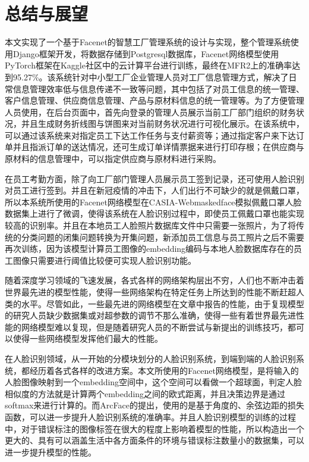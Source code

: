 \section{总结与展望}

本文实现了一个基于Facenet的智慧工厂管理系统的设计与实现，整个管理系统使用Django框架开发，将数据存储到Postgresql数据库，Facenet网络模型使用PyTorch框架在Kaggle社区中的云计算平台进行训练，最终在MFR2上的准确率达到95.27\%。该系统针对中小型工厂企业管理人员对工厂信息管理方式，解决了日常信息管理效率低与信息传递不一致等问题，其中包括了对员工信息的统一管理、客户信息管理、供应商信息管理、产品与原材料信息的统一管理等。为了方便管理人员使用，在后台页面中，首先向登录的管理人员展示当前工厂部门组织的财务状况，并且生成财务折线图与饼图来对当前财务状况进行可视化展示。在该系统中，可以通过该系统来对指定员工下达工作任务与支付薪资等；通过指定客户来下达订单并且指派订单的送达情况，还可生成订单详情票据来进行打印存根；在供应商与原材料的信息管理中，可以指定供应商与原材料进行采购。

在员工考勤方面，除了向工厂部门管理人员展示员工签到记录，还可使用人脸识别对员工进行签到。并且在新冠疫情的冲击下，人们出行不可缺少的就是佩戴口罩，所以本系统所使用的Facenet网络模型在CASIA-Webmaskedface模拟佩戴口罩人脸数据集上进行了微调，使得该系统在人脸识别过程中，即使员工佩戴口罩也能实现较高的识别率。并且在本地员工人脸照片数据库文件中只需要一张照片，为了将传统的分类问题的闭集问题转换为开集问题，新添加员工信息与员工照片之后不需要再次训练，因为该模型计算员工图像的embedding编码与本地人脸数据库存在的员工图像只需要进行阈值比较便可实现人脸识别功能。

随着深度学习领域的飞速发展，各式各样的网络架构层出不穷，人们也不断冲击着世界最先进的模型性能，使得一些网络架构在特定任务上所达到的性能不断赶超人类的水平。尽管如此，一些最先进的网络模型在文章中报告的性能，由于复现模型的研究人员缺少数据集或对超参数的调节不那么准确，使得一些有着世界最先进性能的网络模型难以复现，但是随着研究人员的不断尝试与新提出的训练技巧，都可以使得一些网络模型发挥他们最大的性能。

在人脸识别领域，从一开始的分模块划分的人脸识别系统，到端到端的人脸识别系统，都经历着各式各样的改进方案。本文所使用的Facenet网络模型，是将输入的人脸图像映射到一个embedding空间中，这个空间可以看做一个超球面，判定人脸相似度的方法就是计算两个embedding之间的欧式距离，并且决策边界是通过softmax来进行计算的。而ArcFace\cite{arcface}的提出，使用的是基于角度的、余弦边距的损失函数，可以进一步提升人脸识别系统的准确率。并且人脸识别模型的训练的过程中，对于错误标注的图像标签在很大的程度上影响着模型的性能，所以构造出一个更大的、具有可以涵盖生活中各方面条件的环境与错误标注数量小的数据集，可以进一步提升模型的性能。